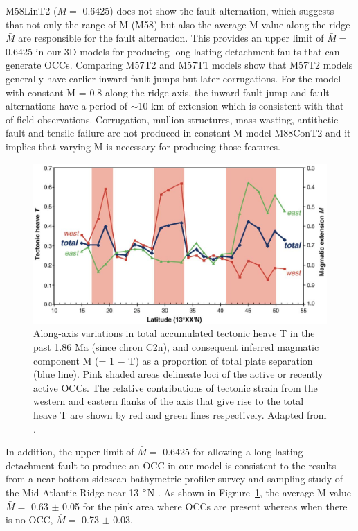 M58LinT2 ($\bar{M} =$ 0.6425) does not show the fault alternation, which suggests that not only the range of M (M58) but also the average M value along the ridge $\bar{M}$ are responsible for the fault alternation. This provides an upper limit of $\bar{M} =$ 0.6425 in our 3D models for producing long lasting detachment faults that can generate OCCs. Comparing M57T2 and M57T1 models show that M57T2 models generally have earlier inward fault jumps but later corrugations. For the model with constant M = 0.8 along the ridge axis, the inward fault jump and fault alternations have a period of $\sim$10 km of extension which is consistent with that of field observations. Corrugation, mullion structures, mass wasting, antithetic fault and tensile failure are not produced in constant M model M88ConT2 and it implies that varying M is necessary for producing those features.

\begin{figure}[h]
 \centering
  \includegraphics[width=1\textwidth]{./Figures/fig_Discussion_ResultsSummary_MacLeod2009.eps}
 \caption[Field observation results adapted from \citep{MacLeod2009}.]{Along-axis variations in total accumulated tectonic heave T in the past 1.86 Ma (since chron C2n), and consequent inferred magmatic component M (= 1 $-$ T) as a proportion of total plate separation (blue line). Pink shaded areas delineate loci of the active or recently active OCCs. The relative contributions of tectonic strain from the western and eastern flanks of the axis that give rise to the total heave T are shown by red and green lines respectively. Adapted from \citep{MacLeod2009}. }
 \label{fig_Discussion_ResultsSummary_MacLeod2009}
\end{figure}

In addition, the upper limit of $\bar{M} = $ 0.6425 for allowing a long lasting detachment fault to produce an OCC in our model is consistent to the results from a near-bottom sidescan bathymetric profiler survey and sampling study of the Mid-Atlantic Ridge near 13 $\degree$N \citep{MacLeod2009}. As shown in Figrure~\hyperref[fig_Discussion_ResultsSummary_MacLeod2009]{\ref{fig_Discussion_ResultsSummary_MacLeod2009}}, the average M value $\bar{M} =$ 0.63 $\pm$ 0.05 for the pink area where OCCs are present whereas when there is no OCC, $\bar{M} =$ 0.73 $\pm$ 0.03.

